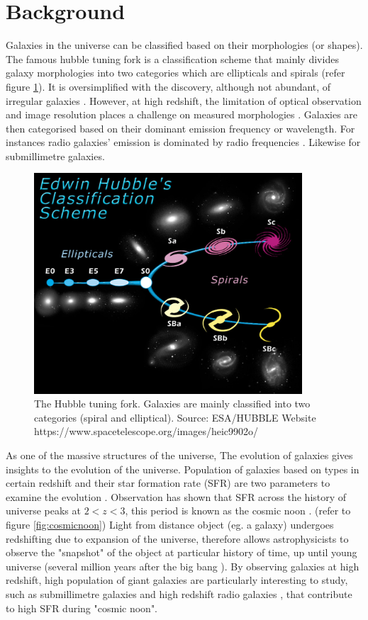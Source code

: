 \documentclass{article}
\begin{document}
\section{Background}
Galaxies in the universe can be classified based on their morphologies (or shapes). The famous hubble tuning fork is a classification scheme that mainly divides galaxy morphologies into two categories which are ellipticals and spirals (refer figure \ref{fig:hubblefork}). It is oversimplified with the discovery, although not abundant, of irregular galaxies \parencite{Gallagher1984}. However, at high redshift, the limitation of optical observation and image resolution places a challenge on measured morphologies \parencite{Rouan2008}. Galaxies are then categorised based on their dominant emission frequency or wavelength. For instances radio galaxies' emission is dominated by radio frequencies \parencite{Slijepcevic2022}. Likewise for submillimetre galaxies.
\medskip

\begin{figure}
    \centering
    \includegraphics[width=100mm]{hubble fork.jpg}
    \caption{The Hubble tuning fork. Galaxies are mainly classified into two categories (spiral and elliptical). Source: ESA/HUBBLE Website https://www.spacetelescope.org/images/heic9902o/}
    \label{fig:hubblefork}
\end{figure}

\noindent As one of the massive structures of the universe, The evolution of galaxies gives insights to the evolution
of the universe. Population of galaxies based on types in certain redshift and their star formation rate (SFR) are two parameters to examine the evolution \parencite{Martin2005}. Observation has shown that SFR across the history of universe peaks at $2 < z < 3$, this period is known as the cosmic noon \parencite{Schreiber2020}. (refer to figure \ref{fig:cosmicnoon}) Light from distance object (eg. a galaxy) undergoes redshifting due to expansion of the universe, therefore allows astrophysicists to observe the "snapshot" of the object at particular history of time, up until young universe (several million years after the big bang \parencite{Jiang2021}).  By observing galaxies at high redshift, high population of giant galaxies are particularly interesting to study, such as submillimetre galaxies and high redshift radio galaxies \parencite{Singh2014} \parencite{Chapman2005},  that contribute to high SFR during "cosmic noon".
\medskip
\end{document}
